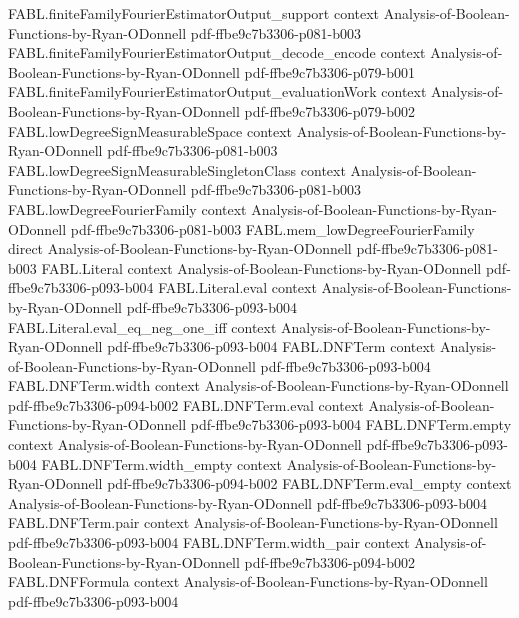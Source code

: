\begin{theorem}
\proofstep
  {FABL.finiteFamilyFourierEstimatorOutput_support}
  {context}
  {Analysis-of-Boolean-Functions-by-Ryan-ODonnell}
  {pdf-ffbe9c7b3306-p081-b003}
\proofstep
  {FABL.finiteFamilyFourierEstimatorOutput_decode_encode}
  {context}
  {Analysis-of-Boolean-Functions-by-Ryan-ODonnell}
  {pdf-ffbe9c7b3306-p079-b001}
\proofstep
  {FABL.finiteFamilyFourierEstimatorOutput_evaluationWork}
  {context}
  {Analysis-of-Boolean-Functions-by-Ryan-ODonnell}
  {pdf-ffbe9c7b3306-p079-b002}
\proofstep
  {FABL.lowDegreeSignMeasurableSpace}
  {context}
  {Analysis-of-Boolean-Functions-by-Ryan-ODonnell}
  {pdf-ffbe9c7b3306-p081-b003}
\proofstep
  {FABL.lowDegreeSignMeasurableSingletonClass}
  {context}
  {Analysis-of-Boolean-Functions-by-Ryan-ODonnell}
  {pdf-ffbe9c7b3306-p081-b003}
\proofstep
  {FABL.lowDegreeFourierFamily}
  {context}
  {Analysis-of-Boolean-Functions-by-Ryan-ODonnell}
  {pdf-ffbe9c7b3306-p081-b003}
\proofstep
  {FABL.mem_lowDegreeFourierFamily}
  {direct}
  {Analysis-of-Boolean-Functions-by-Ryan-ODonnell}
  {pdf-ffbe9c7b3306-p081-b003}
\proofstep
  {FABL.Literal}
  {context}
  {Analysis-of-Boolean-Functions-by-Ryan-ODonnell}
  {pdf-ffbe9c7b3306-p093-b004}
\proofstep
  {FABL.Literal.eval}
  {context}
  {Analysis-of-Boolean-Functions-by-Ryan-ODonnell}
  {pdf-ffbe9c7b3306-p093-b004}
\proofstep
  {FABL.Literal.eval_eq_neg_one_iff}
  {context}
  {Analysis-of-Boolean-Functions-by-Ryan-ODonnell}
  {pdf-ffbe9c7b3306-p093-b004}
\proofstep
  {FABL.DNFTerm}
  {context}
  {Analysis-of-Boolean-Functions-by-Ryan-ODonnell}
  {pdf-ffbe9c7b3306-p093-b004}
\proofstep
  {FABL.DNFTerm.width}
  {context}
  {Analysis-of-Boolean-Functions-by-Ryan-ODonnell}
  {pdf-ffbe9c7b3306-p094-b002}
\proofstep
  {FABL.DNFTerm.eval}
  {context}
  {Analysis-of-Boolean-Functions-by-Ryan-ODonnell}
  {pdf-ffbe9c7b3306-p093-b004}
\proofstep
  {FABL.DNFTerm.empty}
  {context}
  {Analysis-of-Boolean-Functions-by-Ryan-ODonnell}
  {pdf-ffbe9c7b3306-p093-b004}
\proofstep
  {FABL.DNFTerm.width_empty}
  {context}
  {Analysis-of-Boolean-Functions-by-Ryan-ODonnell}
  {pdf-ffbe9c7b3306-p094-b002}
\proofstep
  {FABL.DNFTerm.eval_empty}
  {context}
  {Analysis-of-Boolean-Functions-by-Ryan-ODonnell}
  {pdf-ffbe9c7b3306-p093-b004}
\proofstep
  {FABL.DNFTerm.pair}
  {context}
  {Analysis-of-Boolean-Functions-by-Ryan-ODonnell}
  {pdf-ffbe9c7b3306-p093-b004}
\proofstep
  {FABL.DNFTerm.width_pair}
  {context}
  {Analysis-of-Boolean-Functions-by-Ryan-ODonnell}
  {pdf-ffbe9c7b3306-p094-b002}
\proofstep
  {FABL.DNFFormula}
  {context}
  {Analysis-of-Boolean-Functions-by-Ryan-ODonnell}
  {pdf-ffbe9c7b3306-p093-b004}

\end{theorem}
